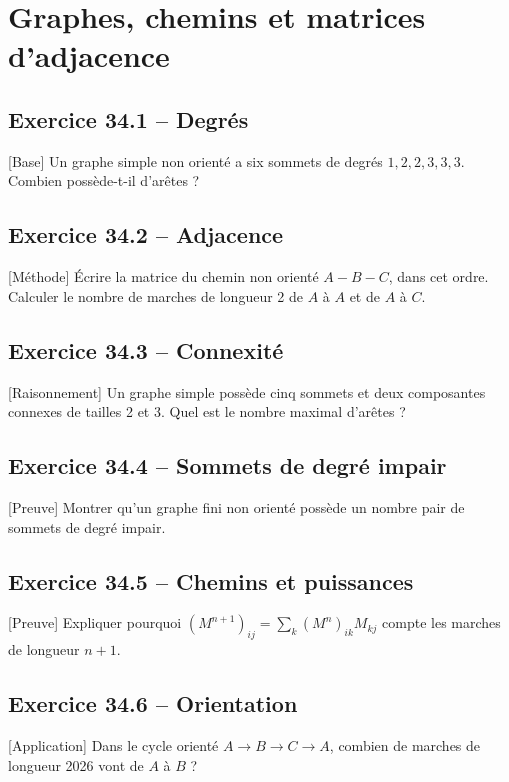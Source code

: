 \chapter{Graphes, chemins et matrices d’adjacence}
\section*{Exercice 34.1 -- Degrés}
[Base] Un graphe simple non orienté a six sommets de degrés $1,2,2,3,3,3$. Combien possède-t-il d'arêtes ?

\section*{Exercice 34.2 -- Adjacence}
[Méthode] Écrire la matrice du chemin non orienté $A-B-C$, dans cet ordre. Calculer le nombre de marches de longueur 2 de $A$ à $A$ et de $A$ à $C$.

\section*{Exercice 34.3 -- Connexité}
[Raisonnement] Un graphe simple possède cinq sommets et deux composantes connexes de tailles 2 et 3. Quel est le nombre maximal d'arêtes ?

\section*{Exercice 34.4 -- Sommets de degré impair}
[Preuve] Montrer qu'un graphe fini non orienté possède un nombre pair de sommets de degré impair.

\section*{Exercice 34.5 -- Chemins et puissances}
[Preuve] Expliquer pourquoi $(M^{n+1})_{ij}=\sum_k(M^n)_{ik}M_{kj}$ compte les marches de longueur $n+1$.

\section*{Exercice 34.6 -- Orientation}
[Application] Dans le cycle orienté $A\to B\to C\to A$, combien de marches de longueur 2026 vont de $A$ à $B$ ?
